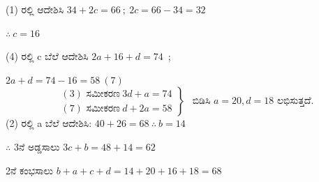 \begin{enumerate}
(1) ರಲ್ಲಿ ಆದೇಶಿಸಿ $34+2c = 66~;~ 2c = 66-34 = 32$

$\therefore~ c=16$

(4) ರಲ್ಲಿ c ಬೆಲೆ ಆದೇಶಿಸಿ $2a+16+d = 74$~; 

$2a+d = 74-16 = 58~ (7)$
\begin{equation*}
\left.
\begin{aligned}
& (3) \text{ ಸಮೀಕರಣ}~ 3d+a = 74\\
& (7) \text{ ಸಮೀಕರಣ}~ d+2a = 58
\end{aligned}
\right\}
~~\text{ ಬಿಡಿಸಿ $a= 20, d = 18$ ಲಭಿಸುತ್ತದೆ.}
\end{equation*}
(2) ರಲ್ಲಿ a ಬೆಲೆ ಆದೇಶಿಸಿ: $40+26 = 68~ \therefore~ b = 14$

\vskip 0.2cm
$\therefore$ 3ನೆ ಅಡ್ಡಸಾಲು $3c+b = 48 + 14 = 62$

2ನೆ ಕಂಭಸಾಲು $b+a+c+d = 14 + 20 + 16 + 18 = 68$
\end{enumerate}
